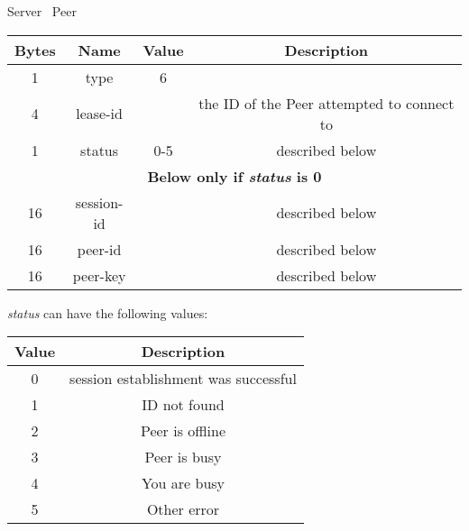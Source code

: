 \begin{center}
    Server \textrightarrow\ Peer\\
    \begin{tabular}{|c|c|c|c|}
        \hline
        \textbf{Bytes} & \textbf{Name} & \textbf{Value} & \textbf{Description}                       \\
        \hline
        1              & type          & 6              &                                            \\
        \hline
        4              & lease-id      &                & the ID of the Peer attempted to connect to \\
        \hline
        1              & status        & 0-5            & described below                            \\
        \hline
        \multicolumn{4}{|c|}{\textbf{Below only if \emph{status} is 0} } \\
        \hline
        16             & session-id    &                & described below                            \\
        \hline
        16             & peer-id       &                & described below                            \\
        \hline
        16             & peer-key      &                & described below                            \\
        \hline
    \end{tabular}
\end{center}

\emph{status} can have the following values:

\begin{center}
    \begin{tabular}{|c|c|}
        \hline
        \textbf{Value} & \textbf{Description}                 \\
        \hline
        0              & session establishment was successful \\
        \hline
        1              & ID not found                         \\
        \hline
        2              & Peer is offline                      \\
        \hline
        3              & Peer is busy                         \\
        \hline
        4              & You are busy                         \\
        \hline
        5              & Other error                          \\
        \hline
    \end{tabular}
\end{center}

